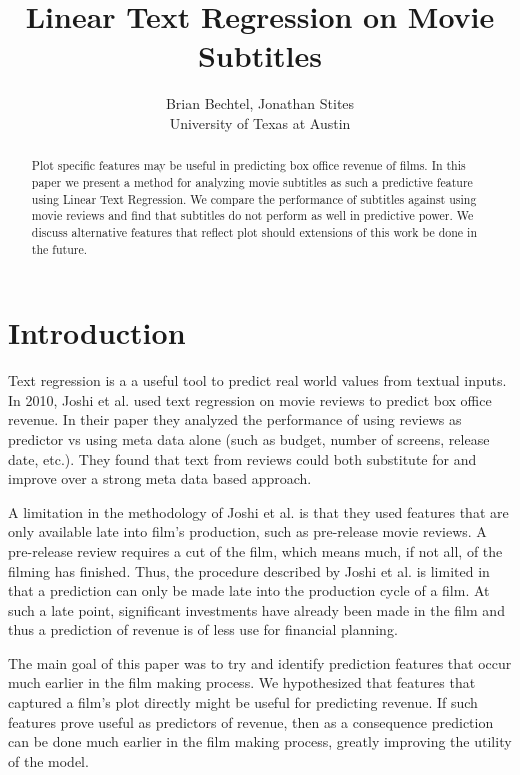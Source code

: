 \documentclass[11pt]{article}
\begin{document}
\title{Linear Text Regression on Movie Subtitles}
\author{Brian Bechtel, Jonathan Stites\\
       University of Texas at Austin}
\date{}

\maketitle

\begin{abstract}
\noindent
Plot specific features may be useful in predicting box office revenue of films.
In this paper we present a method for analyzing movie subtitles as such a predictive
feature using Linear Text Regression. We compare the performance of subtitles against
using movie reviews and find that subtitles do not perform as well in predictive power.
We discuss alternative features that reflect plot should extensions of this work be
done in the future.
\end{abstract}

\section{Introduction}
Text regression is a a useful tool to predict real world values from textual inputs.
In 2010, Joshi et al. used text regression on movie reviews to predict box office revenue.
In their paper they analyzed the performance of using reviews as predictor vs using meta
data alone (such as budget, number of screens, release date, etc.). They found that text
from reviews could both substitute for and improve over a strong meta data based approach.

A limitation in the methodology of Joshi et al. is that they used features that are only
available late into film's production, such as pre-release movie reviews. A pre-release
review requires a cut of the film, which means much, if not all, of the filming has
finished. Thus, the procedure described by Joshi et al. is limited in that a prediction
can only be made late into the production cycle of a film. At such a late point,
significant investments have already been made in the film and thus a prediction of
revenue is of less use for financial planning.

The main goal of this paper was to try and identify prediction features that occur much
earlier in the film making process. We hypothesized that features that captured a film's
plot directly might be useful for predicting revenue. If such features prove useful as
predictors of revenue, then as a consequence prediction can be done much earlier in the
film making process, greatly improving the utility of the model.
\end{document}
